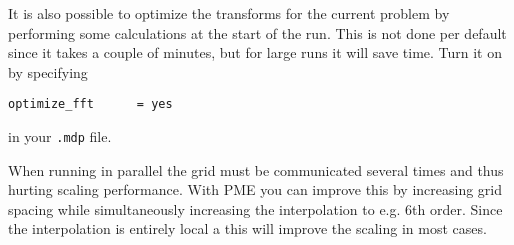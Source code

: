 It is also possible to optimize the transforms for the current problem
by performing some calculations at the start of the run. This is not
done per default since it takes a couple of minutes, but for large
runs it will save time. Turn it on by specifying

\begin{verbatim}
optimize_fft      = yes
\end{verbatim}
in your {\tt .mdp} file.

When running in parallel the grid must be communicated several times
and thus hurting scaling performance. With PME you can improve this
by increasing grid spacing while simultaneously increasing the
interpolation to e.g. 6th order. 
Since the interpolation is entirely local a this will
improve the scaling in most cases.

%
%
%
